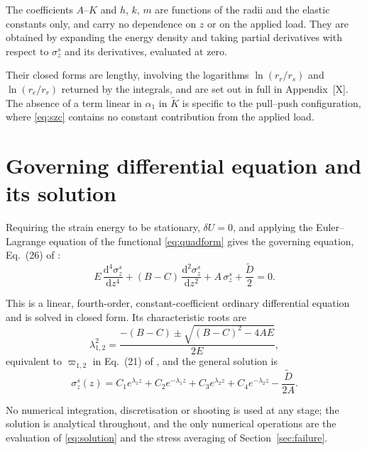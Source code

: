 The coefficients $A$--$K$ and $h$, $k$, $m$ are functions of the radii and the
elastic constants only, and carry no dependence on $z$ or on the applied load.
They are obtained by expanding the energy density and taking partial
derivatives with respect to $\sigma_z^{s}$ and its derivatives, evaluated at
zero. 

Their closed forms are lengthy, involving the logarithms $\ln(r_r/r_s)$ and $\ln(r_e/r_r)$ returned
by the integrals, and are set out in full in Appendix~[X]. The absence
of a term linear in $\alpha_1$ in $\tilde{K}$ is specific to the pull--push
configuration, where \eqref{eq:szc} contains no constant contribution from the
applied load.

\newpage
\section{Governing differential equation and its solution}
\label{sec:ode}

Requiring the strain energy to be stationary, $\delta U = 0$, and
applying the Euler--Lagrange equation of the functional \eqref{eq:quadform}
gives the governing equation, Eq.~(26) of
\textcite{nemesModelingCylindricalAdhesively2009}:
\begin{equation}
\label{eq:ode}
E\,\frac{\mathrm{d}^4\sigma_z^{s}}{\mathrm{d}z^4}
  + (B - C)\,\frac{\mathrm{d}^2\sigma_z^{s}}{\mathrm{d}z^2}
  + A\,\sigma_z^{s} + \frac{\tilde{D}}{2} = 0 .
\end{equation}

This is a linear, fourth-order, constant-coefficient ordinary differential
equation and is solved in closed form. Its characteristic roots are
\begin{equation}
\label{eq:roots}
\lambda_{1,2}^2 = \frac{-(B - C) \pm \sqrt{(B - C)^2 - 4AE}}{2E},
\end{equation}
equivalent to $\varpi_{1,2}$ in Eq.~(21) of
\textcite{alaviAnalyticalProcedureFailure2025}, and the general solution is
\begin{equation}
\label{eq:solution}
\sigma_z^{s}(z) = C_1 e^{\lambda_1 z} + C_2 e^{-\lambda_1 z}
          + C_3 e^{\lambda_2 z} + C_4 e^{-\lambda_2 z}
          - \frac{\tilde{D}}{2A} .
\end{equation}

No numerical integration, discretisation or shooting is used at any stage; the
solution is analytical throughout, and the only numerical operations are the
evaluation of \eqref{eq:solution} and the stress averaging of
Section~\ref{sec:failure}.

